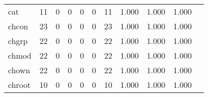 \begin{longtable}{lp{1.2cm}p{1.2cm}p{1.2cm}p{1.2cm}p{1.2cm}p{1.2cm}p{1.2cm}p{1.2cm}p{1.2cm}p{1.2cm}}
cat       &                                    11 &                                                  0 &                                                  0 &                                                  0 &                                                  0 &                                                 11 &                                         1.000 &                                              1.000 &                                              1.000 \\
chcon     &                                    23 &                                                  0 &                                                  0 &                                                  0 &                                                  0 &                                                 23 &                                         1.000 &                                              1.000 &                                              1.000 \\
chgrp     &                                    22 &                                                  0 &                                                  0 &                                                  0 &                                                  0 &                                                 22 &                                         1.000 &                                              1.000 &                                              1.000 \\
chmod     &                                    22 &                                                  0 &                                                  0 &                                                  0 &                                                  0 &                                                 22 &                                         1.000 &                                              1.000 &                                              1.000 \\
chown     &                                    22 &                                                  0 &                                                  0 &                                                  0 &                                                  0 &                                                 22 &                                         1.000 &                                              1.000 &                                              1.000 \\
chroot    &                                    10 &                                                  0 &                                                  0 &                                                  0 &                                                  0 &                                                 10 &                                         1.000 &                                              1.000 &                                              1.000 \\

\end{longtable}
